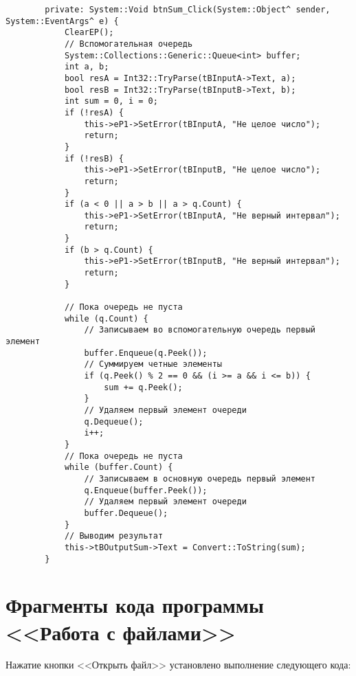 \begin{verbatim}
		private: System::Void btnSum_Click(System::Object^ sender, System::EventArgs^ e) {
			ClearEP();
			// Вспомогательная очередь
			System::Collections::Generic::Queue<int> buffer;
			int a, b;
			bool resA = Int32::TryParse(tBInputA->Text, a);
			bool resB = Int32::TryParse(tBInputB->Text, b);
			int sum = 0, i = 0;
			if (!resA) {
				this->eP1->SetError(tBInputA, "Не целое число");
				return;
			}
			if (!resB) {
				this->eP1->SetError(tBInputB, "Не целое число");
				return;
			}
			if (a < 0 || a > b || a > q.Count) {
				this->eP1->SetError(tBInputA, "Не верный интервал");
				return;
			}
			if (b > q.Count) {
				this->eP1->SetError(tBInputB, "Не верный интервал");
				return;
			}

			// Пока очередь не пуста
			while (q.Count) {
				// Записываем во вспомогательную очередь первый элемент
				buffer.Enqueue(q.Peek());
				// Суммируем четные элементы
				if (q.Peek() % 2 == 0 && (i >= a && i <= b)) {
					sum += q.Peek();
				}
				// Удаляем первый элемент очереди
				q.Dequeue();
				i++;
			}
			// Пока очередь не пуста
			while (buffer.Count) {
				// Записываем в основную очередь первый элемент
				q.Enqueue(buffer.Peek());
				// Удаляем первый элемент очереди
				buffer.Dequeue();
			}
			// Выводим результат
			this->tBOutputSum->Text = Convert::ToString(sum);
		}
\end{verbatim}

\section{Фрагменты кода программы <<Работа с файлами>>}\label{app:task8}

Нажатие кнопки <<Открыть файл>> установлено выполнение следующего кода:

